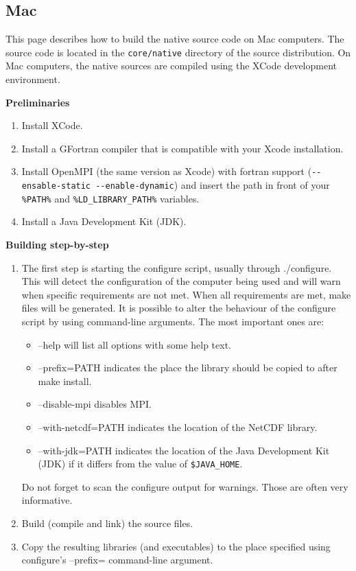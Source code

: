 \subsection{Mac}

This page describes how to build the \oda native source code on Mac computers. The source code is located in the \verb|core/native| directory of the source distribution. On Mac computers, the native sources are compiled using the XCode development environment. 

\textbf{Preliminaries}

\begin{enumerate}
	\item Install XCode.
	\item Install a GFortran compiler that is compatible with your Xcode installation.
	\item Install OpenMPI (the same version as Xcode) with fortran support (\verb|--ensable-static --enable-dynamic|) and insert the path in front of your \verb|%PATH%| and \verb|%LD_LIBRARY_PATH%| variables.
	\item Install a Java Development Kit (JDK).
\end{enumerate}

\textbf{Building step-by-step}

\begin{enumerate}
	\item The first step is starting the configure script, usually through ./configure. This will detect the configuration of the computer being used and will warn when specific requirements are not met. When all requirements are met, make files will be generated. It is possible to alter the behaviour of the configure script by using command-line arguments. The most important ones are: 
	\begin{itemize}
		\item --help will list all options with some help text.
		\item --prefix=PATH indicates the place the library should be copied to after make install.
		\item --disable-mpi disables MPI.
		\item --with-netcdf=PATH indicates the location of the NetCDF library.
		\item --with-jdk=PATH indicates the location of the Java Development Kit (JDK) if it differs from the value of \verb|$JAVA_HOME|.
	\end{itemize}
	Do not forget to scan the configure output for warnings. Those are often very informative. 
	\item Build (compile and link) the source files.
	\item Copy the resulting libraries (and executables) to the place specified using configure's --prefix= command-line argument. 
\end{enumerate}

